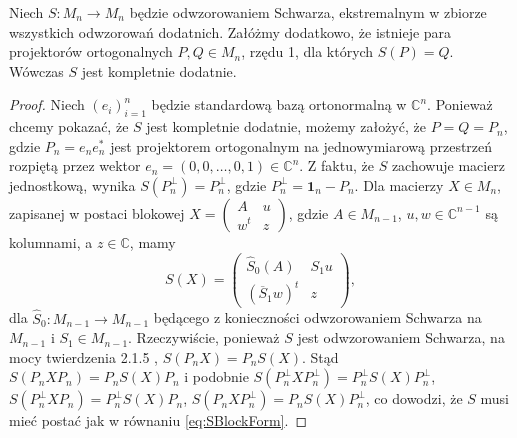 \begin{Theorem}
\label{thm:ExtremalSchwarz}
Niech $S: M_{n} \rightarrow M_{n}$
będzie odwzorowaniem Schwarza, ekstremalnym w zbiorze wszystkich odwzorowań
dodatnich. Załóżmy dodatkowo, że
istnieje para projektorów ortogonalnych $P, Q \in M_{n}$, rzędu 1,
dla których $S(P) = Q$.
Wówczas $S$ jest kompletnie dodatnie.
\end{Theorem}
\begin{proof}
Niech $(e_{i})_{i=1}^{n}$
będzie standardową bazą ortonormalną w $\mathbb{C}^{n}$.
Ponieważ chcemy pokazać, że $S$ jest kompletnie dodatnie,
możemy założyć, że $P = Q = P_{n}$,
gdzie $P_{n} = e_{n} e_{n}^{*}$ jest projektorem ortogonalnym na jednowymiarową
przestrzeń rozpiętą przez wektor $e_{n} = (0,0,\ldots,0,1) \in \mathbb{C}^{n}$.
Z faktu, że $S$ zachowuje macierz jednostkową, wynika
$S(P_{n}^{\perp}) = P_{n}^{\perp}$,
gdzie $P_{n}^{\perp} = \mathbf{1}_{n} - P_{n}$.
Dla macierzy $X \in M_{n}$,
zapisanej w postaci blokowej
$X = \left( \begin{smallmatrix} A & u \\ w^{t} & z \end{smallmatrix} \right)$,
gdzie $A \in M_{n-1}$, $u, w \in \mathbb{C}^{n-1}$ są kolumnami, a
$z \in \mathbb{C}$, mamy
\begin{equation}
\label{eq:SBlockForm}
    S (X) = \begin{pmatrix}
        \hat{S}_{0}(A) & S_{1} u \\
        (\overline{S}_{1} w)^{t} & z
    \end{pmatrix},
\end{equation}
dla $\hat{S}_{0}: M_{n-1} \rightarrow M_{n-1}$ będącego z konieczności
odwzorowaniem Schwarza na $M_{n-1}$ i $S_{1} \in M_{n-1}$.
Rzeczywiście, ponieważ $S$ jest odwzorowaniem Schwarza,
na mocy twierdzenia 2.1.5 \cite{Stormer2013},
$S(P_{n} X) = P_{n} S(X)$.
Stąd
$S(P_{n} X P_{n}) = P_{n} S(X) P_{n}$ i podobnie
$S(P_{n}^{\perp} X P_{n}^{\perp}) = P_{n}^{\perp} S(X) P_{n}^{\perp}$,
$S(P_{n}^{\perp} X P_{n}) = P_{n}^{\perp} S(X) P_{n}$,
$S(P_{n} X P_{n}^{\perp}) = P_{n} S(X) P_{n}^{\perp}$,
co dowodzi, że $S$ musi mieć postać jak w równaniu \eqref{eq:SBlockForm}.


\end{proof}

